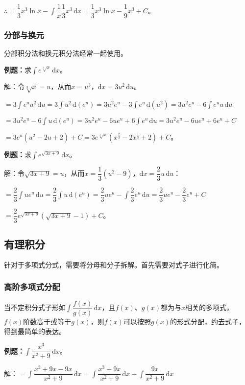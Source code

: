 \documentclass[UTF8, 12pt]{ctexart}
\begin{document}
$\therefore=\dfrac{1}{3}x^3\ln x-\displaystyle{\int\dfrac{1}{x}\dfrac{1}{3}x^3\,\textrm{d}x}=\dfrac{1}{3}x^3\ln x-\dfrac{1}{9}x^3+C$。

\subsubsection{分部与换元}

分部积分法和换元积分法经常一起使用。

\textbf{例题：}求$\int e^{\sqrt[3]{x}}\,\textrm{d}x$。

解：令$\sqrt[3]{x}=u$，从而$x=u^3$，$\textrm{d}x=3u^2\,\textrm{d}u$。

$=3\int e^uu^2\,\textrm{d}u=3\int u^2\,\textrm{d}(e^u)=3u^2e^u-3\int e^u\,\textrm{d}(u^2)=3u^2e^u-6\int e^uu\,\textrm{d}u$

$=3u^2e^u-6\int u\,\textrm{d}(e^u)=3u^2e^u-6ue^u+6\int e^u\,\textrm{d}u=3u^2e^u-6ue^u+6e^u+C$

$=3e^u(u^2-2u+2)+C=3e^{\sqrt[3]{x}}(x^{\frac{2}{3}}-2x^{\frac{1}{3}}+2)+C$。

\textbf{例题：}求$\int e^{\sqrt{3x+9}}\,\textrm{d}x$。

解：令$\sqrt{3x+9}=u$，从而$x=\dfrac{1}{3}(u^2-9)$，$\textrm{d}x=\dfrac{2}{3}u\,\textrm{d}u$：

$=\displaystyle{\dfrac{2}{3}\int ue^u\,\textrm{d}u=\dfrac{2}{3}\int u\,\textrm{d}(e^u)=\dfrac{2}{3}ue^u-\int\dfrac{2}{3}e^u\,\textrm{d}u=\dfrac{2}{3}ue^u-\dfrac{2}{3}e^u+C}$

$=\dfrac{2}{3}e^{\sqrt{3x+9}}(\sqrt{3x+9}-1)+C$。

\subsection{有理积分}

针对于多项式分式，需要将分母和分子拆解。首先需要对式子进行化简。

\subsubsection{高阶多项式分配}

当不定积分式子形如$\displaystyle{\int\dfrac{f(x)}{g(x)}\,\textrm{d}x}$，且$f(x)$、$g(x)$都为与$x$相关的多项式，$f(x)$阶数高于或等于$g(x)$，则$f(x)$可以按照$g(x)$的形式分配，约去式子，得到最简单的表达。

\textbf{例题：}$\displaystyle{\int\dfrac{x^3}{x^2+9}\,\textrm{d}x}$。 \medskip

解：$=\displaystyle{\int\dfrac{x^3+9x-9x}{x^2+9}\,\textrm{d}x=\int\dfrac{x^3+9x}{x^2+9}\,\textrm{d}x-\int\dfrac{9x}{x^2+9}\,\textrm{d}x}$ \medskip
\end{document}
